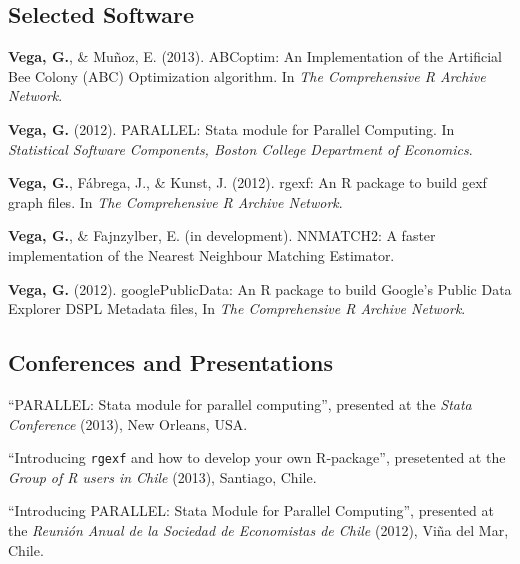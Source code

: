 \documentclass[letterpaper, 12pt]{article}
\renewenvironment{itemize}{
  \begin{list}{}{
    \setlength{\leftmargin}{0.45cm}
  }
}{
  \end{list}
}
\begin{document}
\subsection*{Selected Software}
\begin{itemize}
\item {\bf Vega, G.}, \& Mu\~noz, E. (2013). ABCoptim: An Implementation of the Artificial Bee Colony (ABC) Optimization algorithm. In {\it The Comprehensive R Archive Network}.
\item {\bf Vega, G.} (2012). PARALLEL: Stata module for Parallel Computing. In {\it Statistical Software Components, Boston College Department of Economics}.
\item {\bf Vega, G.}, F\'abrega, J., \& Kunst, J. (2012). rgexf: An R package to build gexf graph files. In {\it The Comprehensive R Archive Network}.
\item {\bf Vega, G.}, \& Fajnzylber, E. (in development). NNMATCH2: A faster implementation of the Nearest Neighbour Matching Estimator.
\item {\bf Vega, G.} (2012). googlePublicData: An R package to build Google's Public Data Explorer DSPL Metadata files, In {\it The Comprehensive R Archive Network}.
\end{itemize}

\subsection*{Conferences and Presentations}

\begin{itemize}
\item ``PARALLEL: Stata module for parallel computing'', presented at the {\it Stata Conference} (2013), New Orleans, USA.
\item ``Introducing {\tt rgexf} and how to develop your own R-package'', presetented at the {\it Group of R users in Chile} (2013), Santiago, Chile.
\item ``Introducing PARALLEL: Stata Module for Parallel Computing'', presented at the {\it Reuni\'on Anual de la Sociedad de Economistas de Chile} (2012), Vi\~na del Mar, Chile.
\end{itemize}

\end{document}

